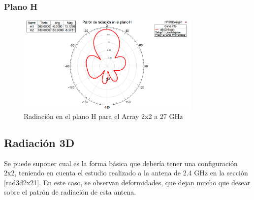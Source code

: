 \subsubsection{Plano H}
\begin{figure}[H]
    \centering
        \includegraphics[width=0.8\textwidth]{archivos/analisis/2x23/5}
        \caption{Radiación en el plano H para el Array 2x2 a 27 GHz}
        \label{fig:H2x23}
\end{figure}

\newpage
\subsection{Radiación 3D}
\par Se puede suponer cual es la forma básica que debería tener una configuración 2x2, teniendo en cuenta el estudio realizado a la antena de 2.4 GHz en la sección \ref{rad3d2x21}. En este caso, se observan deformidades, que dejan mucho que desear sobre el patrón de radiación de esta antena.


